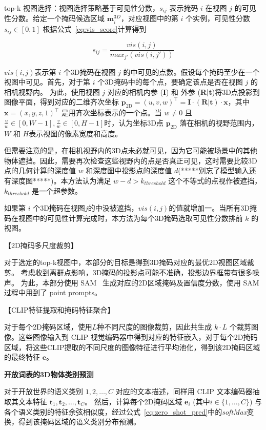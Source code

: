 \documentclass[12pt]{article}
\newcommand{\myEmph}[1]{\textbf{\textcolor[rgb]{0,0,0.25}{#1}}}
\begin{document}
top-k 视图选择：视图选择策略基于可见性分数，$s_{ij}$ 表示掩码 $i$ 在视图 $j$ 的可见性分数。给定一个掩码候选区域 $\boldsymbol{m}_i^{3D}$，对应视图中的第 $i$ 个实例，可见性分数 $s_{ij} \in [0, 1]$ 根据公式~\ref{eq:vis_score}计算得到

\begin{equation}
    s_{ij} = \frac{vis(i,j)}{max_{j'}(vis(i,j'))}
    \label{eq:vis_score}
\end{equation}

$vis(i,j)$表示第 $i$ 个3D掩码在视图 $j$ 的中可见的点数。假设每个掩码至少在一个视图中可见。首先，对于第 $i$ 个3D掩码中的每个点，要确定该点是否在视图 $j$ 的相机视野内。
为此，使用视图 $j$ 对应的相机内参 (\textbf{I}) 和 外参 (\textbf{R|t})将3D点投影到图像平面，得到对应的二维齐次坐标 $\textbf{p}_{\text{2D}} = (u, v, w)^\top = \textbf{I}\cdot(\textbf{R|t})\cdot \textbf{x}$，其中 $\textbf{x} = (x,y,z,1)^\top$ 是用齐次坐标表示的一个点。当 $w \neq 0$ 且 $\frac{u}{w} \in [0, W-1], \frac{v}{w} \in [0, H-1]$时，认为坐标3D点 $\textbf{p}_{\text{2D}}$ 落在相机的视野范围内，$W$ 和 $H$表示视图的像素宽度和高度。

但需要注意的是，在相机视野内的3D点未必就可见，因为它可能被场景中的其他物体遮挡。因此，需要再次检查这些视野内的点是否真正可见，这时需要比较3D点的几何计算的深度值 $w$ 和深度图中投影点的深度值 $d$(*****别忘了模型输入还有深度图*****)。本方法认为满足 $w - d > k_{threshold}$ 这个不等式的点视作被遮挡，$k_{threshold}$ 是一个超参数。

如果第 $i$ 个3D掩码在视图$j$的中没被遮挡，$vis(i,j)$的值就增加一。当所有3D掩码在视图中的可见性计算完成时，本方法为每个3D掩码选取可见性分数排前 $k$ 的视图。

【2D掩码多尺度裁剪】

对于选定的top-k视图中，本部分的目标是得到3D掩码对应的最优2D视图区域裁剪。
考虑收到离群点影响，3D掩码的投影点可能不准确，投影边界框带有很多噪声。
为此，本部分使用 SAM~\cite{kirillov23sam} 生成对应的2D区域掩码及置信度分数，使用 SAM 过程中用到了 point prompts。

【CLIP特征提取和掩码特征聚合】

对于每个2D掩码区域，使用$L$种不同尺度的图像裁剪，因此共生成 $k\cdot L$ 个裁剪图像。这些图像输入到 CLIP 视觉编码器中得到对应的特征嵌入，对于每个2D掩码区域，将这些CLIP提取的不同尺度的图像特征进行平均池化，得到该2D掩码区域的最终特征 $\textbf{e}$。

\myEmph{开放词表的3D物体类别预测}

对于开放世界的语义类别 $1, 2, \dots, C$ 对应的文本描述，同样用 CLIP 文本编码器抽取其文本特征 $\textbf{t}_1, \textbf{t}_2, \dots, \textbf{t}_C$。
然后，计算每个2D掩码区域 $\textbf{e}_i$ (其中$i \in \{1,\dots,C\}$) 与各个语义类别的特征余弦相似度，经过公式~\ref{eq:zero_shot_pred}中的\emph{softMax}变换，得到该掩码区域的语义类别分布预测。
\end{document}
